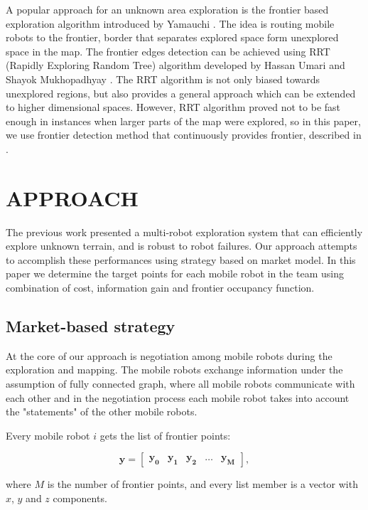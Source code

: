 \documentclass[letterpaper, 10 pt, conference]{ieeeconf}  %
\begin{document}
A popular approach for an unknown area exploration is the frontier based exploration algorithm introduced by Yamauchi \cite{Yamauchi}. The idea is routing mobile robots to the frontier, border that separates explored space form unexplored space in the map. The frontier edges detection can be achieved using RRT (Rapidly Exploring Random Tree) algorithm developed by Hassan Umari and Shayok Mukhopadhyay \cite{Umari}. The RRT algorithm is not only biased towards unexplored regions, but also provides a general approach which can be extended to higher dimensional spaces. However, RRT algorithm proved not to be fast enough in instances when larger parts of the map were explored, so in this paper, we use frontier detection method that continuously provides frontier, described in \cite{juraj}.   

\section{APPROACH}

The previous work presented a multi-robot exploration system that can efficiently explore unknown terrain, and is robust to robot failures. Our approach attempts to accomplish these performances using strategy based on market model. 
In this paper we determine the target points for each mobile robot in the team using combination of cost, information gain  and frontier occupancy function. 

\subsection{Market-based strategy} 

At the core of our approach is negotiation among mobile robots during the exploration and mapping. The mobile robots exchange information under the assumption of fully connected graph, where all mobile robots communicate with each other and in the negotiation process each mobile robot takes into account the "statements" of the other mobile robots.

Every mobile robot $i$ gets the list of frontier points:

\begin{equation}
   \boldsymbol{y}=\begin{bmatrix}
    \boldsymbol{y_{0}} & \boldsymbol{y_{1}} & \boldsymbol{y_{2}} & \hdots & \boldsymbol{y_{M}}
\end{bmatrix},
\end{equation}

where $M$ is  the number of frontier points, and every list member is a vector with $x$, $y$ and $z$ components. 
\end{document}
